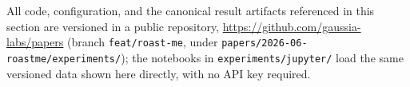\documentclass[11pt,a4paper]{article}
\newcommand{\repourl}{https://github.com/gaussia-labs/papers}
\begin{document}
All code, configuration, and the canonical result artifacts referenced in this
section are versioned in a public repository, \url{\repourl} (branch
\texttt{feat/roast-me}, under \texttt{papers/2026-06-roastme/experiments/}); the
notebooks in \texttt{experiments/jupyter/} load the same versioned data shown
here directly, with no API key required.


\clearpage


\end{document}
